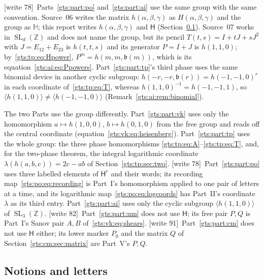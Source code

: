 \documentclass[11pt,letterpaper]{article}
\theoremstyle{definition}
\theoremstyle{remark}
\newcommand{\Z}{\mathbb Z}
\newcommand{\SL}{\operatorname{SL}}
\newcommand{\HH}{\mathsf H}
\newcommand{\bn}{\mathfrak b}
\newcommand{\wtagb}{\textup{[write 78]}}
\newcommand{\wtagc}{\textup{[write 82]}}
\newcommand{\wtagd}{\textup{[write 91]}}
\begin{document}
\wtagb\ Parts~\ref{gts:part:po} and~\ref{gts:part:ai} use the same group with the same convention. Source~06 writes the matrix $h(\alpha,\beta,\gamma)$ as $H(\alpha,\beta,\gamma)$ and the group as $\mathbb H$; this report writes $h(\alpha,\beta,\gamma)$ and $\HH$ (Section~\ref{gts:sec:notation}). Source~07 works in $\SL_d(\Z)$ and does not name the group, but its pencil $T(t,s)=I+tJ+sJ^2$ with $J=E_{12}+E_{23}$ is $h(t,t,s)$ and its generator $P=I+J$ is $h(1,1,0)$; by~\eqref{gts:tp:eq:Hpower}, $P^m=h(m,m,\bn(m))$, which is its equation~\eqref{gts:ai:eq:Ppowers}. Part~\ref{gts:part:tp}'s third phase uses the same binomial device in another cyclic subgroup: $h(-r,-r,\bn(r))=h(-1,-1,0)^r$ in each coordinate of~\eqref{gts:tp:eq:T}, whereas $h(1,1,0)^{-1}=h(-1,-1,1)$, so $\langle h(1,1,0)\rangle\neq\langle h(-1,-1,0)\rangle$ (Remark~\ref{gts:ai:rem:binomial}).

The two Parts use the group differently. Part~\ref{gts:part:vk} uses only the homomorphism $a\mapsto h(1,0,0)$, $b\mapsto h(0,1,0)$ from the free group and reads off the central coordinate (equation~\eqref{gts:vk:eq:heisenberg}). Part~\ref{gts:part:tp} uses the whole group: the three phase homomorphisms \eqref{gts:tp:eq:A}--\eqref{gts:tp:eq:T}, and, for the two-phase theorem, the integral logarithmic coordinate $\lambda(h(a,b,c))=2c-ab$ of Section~\ref{gts:tp:sec:two}. \wtagb\ Part~\ref{gts:part:po} uses three labelled elements of $\HH^r$ and their words; its recording map~\eqref{gts:po:eq:recording} is Part~I's homomorphism applied to one pair of letters at a time, and its logarithmic map~\eqref{gts:po:eq:logcoords} has Part~II's coordinate $\lambda$ as its third entry. Part~\ref{gts:part:ai} uses only the cyclic subgroup $\langle h(1,1,0)\rangle$ of $\SL_3(\Z)$. \wtagc\ Part~\ref{gts:part:um} does not use $\HH$; its free pair $P,Q$ is Part~I's Sanov pair $A,B$ of~\eqref{gts:vk:eq:shears}. \wtagd\ Part~\ref{gts:part:cm} does not use $\HH$ either; its lower marker $P_0$ and the matrix $Q$ of Section~\ref{gts:cm:sec:matrix} are Part~V's $P,Q$.

\subsection{Notions and letters}\label{gts:sec:notation}
\end{document}
